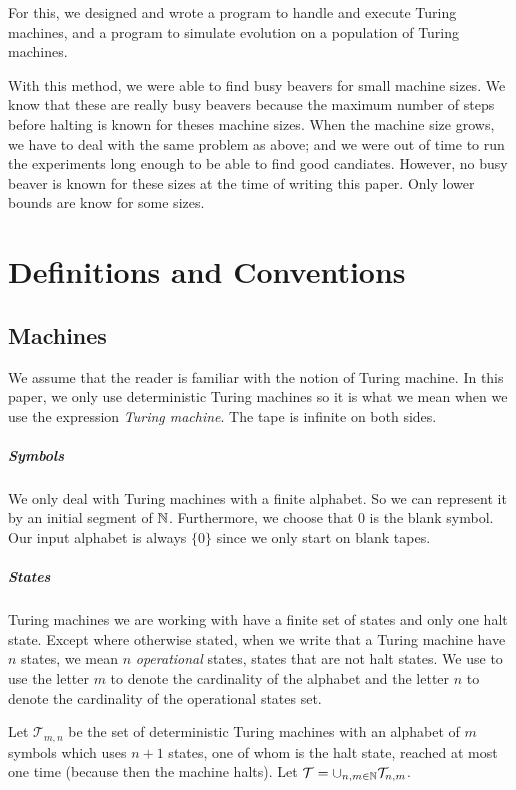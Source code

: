 \documentclass{report}
\begin{document}
For this, we designed and wrote a program to handle and execute Turing machines, and a program to simulate evolution on a population of Turing machines.

With this method, we were able to find busy beavers for small machine sizes. We know that these are really busy beavers because the maximum number of steps before halting is known for theses machine sizes. When the machine size grows, we have to deal with the same problem as above; and we were out of time to run the experiments long enough to be able to find good candiates. However, no busy beaver is known for these sizes at the time of writing this paper. Only lower bounds are know for some sizes.

\chapter{Definitions and Conventions}
\label{chap:pre}

\section{Machines}
\label{sec:ma}

We assume that the reader is familiar with the notion of Turing machine. In this paper, we only use deterministic Turing machines so it is what we mean when we use the expression \emph{Turing machine}. The tape is infinite on both sides.

\paragraph{Symbols}
We only deal with Turing machines with a finite alphabet. So we can represent it by an initial segment of $\mathbb{N}$. Furthermore, we choose that $0$ is the blank symbol. Our input alphabet is always $\{0\}$ since we only start on blank tapes. 

\paragraph{States}
Turing machines we are working with have a finite set of states and only one halt state.
 Except where otherwise stated, when we write that a Turing machine have $n$ states, we mean $n$ \emph{operational} states, \ie states that are not halt states. We use to use the letter $m$ to denote the cardinality of the alphabet and the letter $n$ to denote the cardinality of the operational states set.

 Let $\mathcal{T}_{m,n}$ be the set of deterministic Turing machines with an alphabet of $m$ symbols which uses $n + 1$ states, one of whom is the halt state, reached at most one time (because then the machine halts). Let  $\mathcal{T} = \cup_{n,m \in \mathbb{N}} \mathcal{T}_{n,m}$.
\end{document}
